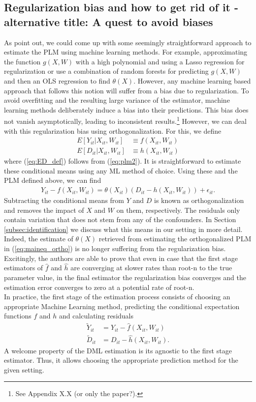 \subsection{Regularization bias and how to get rid of it - alternative title: A quest to avoid biases}
As \cite{DML2017} point out, we could come up with some seemingly straightforward approach to estimate the PLM using machine learning methods. For example, approximating the function $g(X, W)$ with a high polynomial and using a Lasso regression for regularization or use a combination of random forests for predicting $g(X, W)$ and then an OLS regression to find $\theta(X)$. However, any machine learning based approach that follows this notion will suffer from a bias due to regularization. To avoid overfitting and the resulting large variance of the estimator, machine learning methods deliberately induce a bias into their predictions. This bias does not vanish asymptotically, leading to inconsistent results.\footnote{See Appendix X.X (or only the paper?).} However, we can deal with this regularization bias using orthogonalization. For this, we define 
\begin{align}
    E[Y_{it}|X_{it}, W_{it}] &\equiv f(X_{it}, W_{it}) \label{eq:EY_def}\\ 
    E[D_{it}|X_{it}, W_{it}] &\equiv h(X_{it}, W_{it}) \label{eq:ED_def}
\end{align}
where (\ref{eq:ED_def}) follows from (\ref{eq:plm2}). It is straightforward to estimate these conditional means using any ML method of choice. Using these and the PLM defined above, we can find 
\begin{align}
    Y_{it}-f(X_{it}, W_{it})=\theta(X_{it})(D_{it}-h(X_{it}, W_{it})) + \epsilon_{it}. \label{eq:maineq_ortho}
\end{align}
Subtracting the conditional means from $Y$ and $D$ is known as orthogonalization and removes the impact of $X$ and $W$ on them, respectively. The residuals only contain variation that does not stem from any of the confounders. In Section \ref{subsec:identification} we discuss what this means in our setting in more detail. Indeed, the estimate of $\theta(X)$ retrieved from  estimating the orthogonalized PLM in (\ref{eq:maineq_ortho}) is no longer suffering from the regularization bias. Excitingly, the authors are able to prove that even in case that the first stage estimators of $\hat{f}$ and $\hat{h}$ are converging at slower rates than root-n to the true parameter value, in the final estimator the regularization bias converges and the estimation error converges to zero at a potential rate of root-n. \\
In practice, the first stage of the estimation process consists of choosing an appropriate Machine Learning method, predicting the conditional expectation functions $f$ and $h$ and calculating residuals 
\begin{align*} 
    \tilde{Y}_{it}&=Y_{it}-\hat{f}(X_{it}, W_{it}) \\ 
    \tilde{D}_{it}&=D_{it}-\hat{h}(X_{it}, W_{it}).
\end{align*}
A welcome property of the DML estimation is its agnostic to the first stage estimator. Thus, it allows choosing the appropriate prediction method for the given setting. 

